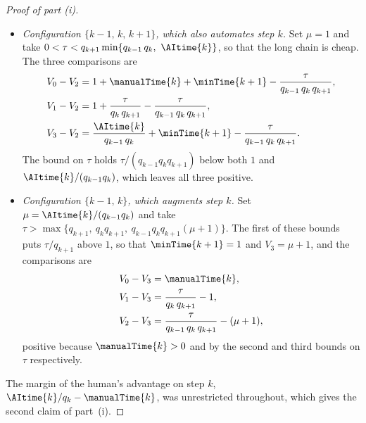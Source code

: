 \begin{proof}[Proof of part (i)]
\begin{itemize}
\item \emph{Configuration $\{k-1,\, k,\, k+1\}$, which also automates step $k$.}
Set $\mu = 1$ and take $0 < \tau < q_{k+1} \min\{q_{k-1}\, q_k,\ \AItime{k}\}$, so that the long chain is cheap.
The three comparisons are
\begin{align*}
V_0 - V_2 &= 1 + \manualTime{k} + \minTime{k+1} - \frac{\tau}{q_{k-1}\, q_k\, q_{k+1}}, \\
V_1 - V_2 &= 1 + \frac{\tau}{q_k\, q_{k+1}} - \frac{\tau}{q_{k-1}\, q_k\, q_{k+1}}, \\
V_3 - V_2 &= \frac{\AItime{k}}{q_{k-1}\, q_k} + \minTime{k+1} - \frac{\tau}{q_{k-1}\, q_k\, q_{k+1}}.
\end{align*}
The bound on $\tau$ holds $\tau/(q_{k-1} q_k q_{k+1})$ below both $1$ and $\AItime{k}/(q_{k-1} q_k)$, which leaves all three positive.

\item \emph{Configuration $\{k-1,\, k\}$, which augments step $k$.}
Set $\mu = \AItime{k}/(q_{k-1} q_k)$ and take $\tau > \max\{q_{k+1},\ q_k q_{k+1},\ q_{k-1} q_k q_{k+1} (\mu+1)\}$.
The first of these bounds puts $\tau/q_{k+1}$ above $1$, so that $\minTime{k+1} = 1$ and $V_3 = \mu + 1$, and the comparisons are
\begin{align*}
V_0 - V_3 &= \manualTime{k}, \\
V_1 - V_3 &= \frac{\tau}{q_k\, q_{k+1}} - 1, \\
V_2 - V_3 &= \frac{\tau}{q_{k-1}\, q_k\, q_{k+1}} - (\mu + 1),
\end{align*}
positive because $\manualTime{k} > 0$ and by the second and third bounds on $\tau$ respectively.
\end{itemize}

The margin of the human's advantage on step $k$, $\AItime{k}/q_k - \manualTime{k}$, was unrestricted throughout, which gives the second claim of part~(i).
\end{proof}

